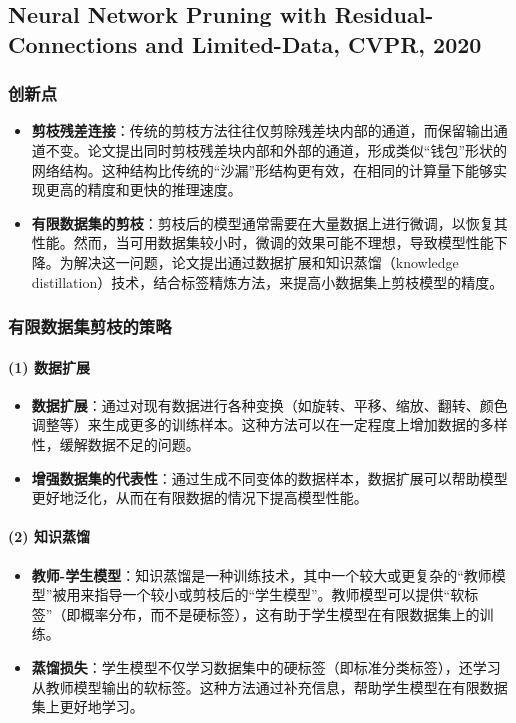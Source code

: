 \documentclass[twocolumn, 10pt]{article} %
\begin{document}
\subsection{Neural Network Pruning with Residual-Connections and Limited-Data, CVPR, 2020}
\subsubsection{创新点}
\begin{itemize}[left=2em] %
    \item \textbf{剪枝残差连接}：传统的剪枝方法往往仅剪除残差块内部的通道，而保留输出通道不变。论文提出同时剪枝残差块内部和外部的通道，形成类似“钱包”形状的网络结构。这种结构比传统的“沙漏”形结构更有效，在相同的计算量下能够实现更高的精度和更快的推理速度。
    \item \textbf{有限数据集的剪枝}：剪枝后的模型通常需要在大量数据上进行微调，以恢复其性能。然而，当可用数据集较小时，微调的效果可能不理想，导致模型性能下降。为解决这一问题，论文提出通过数据扩展和知识蒸馏（knowledge distillation）技术，结合标签精炼方法，来提高小数据集上剪枝模型的精度。
\end{itemize}

\subsubsection{有限数据集剪枝的策略}
\paragraph{(1) 数据扩展}
\begin{itemize}[left=2em] %
    \item \textbf{数据扩展}：通过对现有数据进行各种变换（如旋转、平移、缩放、翻转、颜色调整等）来生成更多的训练样本。这种方法可以在一定程度上增加数据的多样性，缓解数据不足的问题。
    \item \textbf{增强数据集的代表性}：通过生成不同变体的数据样本，数据扩展可以帮助模型更好地泛化，从而在有限数据的情况下提高模型性能。
\end{itemize}


\paragraph{(2) 知识蒸馏} 
\begin{itemize}[left=2em] %
    \item \textbf{教师-学生模型}：知识蒸馏是一种训练技术，其中一个较大或更复杂的“教师模型”被用来指导一个较小或剪枝后的“学生模型”。教师模型可以提供“软标签”（即概率分布，而不是硬标签），这有助于学生模型在有限数据集上的训练。
    \item \textbf{蒸馏损失}：学生模型不仅学习数据集中的硬标签（即标准分类标签），还学习从教师模型输出的软标签。这种方法通过补充信息，帮助学生模型在有限数据集上更好地学习。
\end{itemize}
\end{document}
